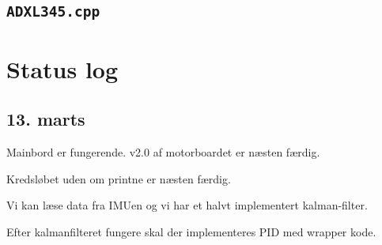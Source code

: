 \documentclass[a4paper,oneside,article,danish,table]{memoir}
\begin{document}
\section{\texttt{ADXL345.cpp}}


\chapter{Status log}

\section{13. marts}
Mainbord er fungerende. v2.0 af motorboardet er næsten færdig.

Kredsløbet uden om printne er næsten færdig.

Vi kan læse data fra IMUen og vi har et halvt implementert kalman-filter.

Efter kalmanfilteret fungere skal der implementeres PID med wrapper kode.
\end{document}
